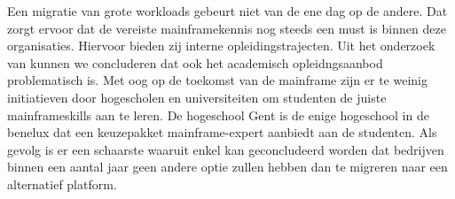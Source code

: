 Een migratie van grote workloads gebeurt niet van de ene dag op de andere. Dat zorgt ervoor dat de vereiste mainframekennis nog steeds een must is binnen deze organisaties. Hiervoor bieden zij interne opleidingstrajecten. Uit het onderzoek van \textcite{2020} kunnen we concluderen dat ook het academisch opleidngsaanbod problematisch is. Met oog op de toekomst van de mainframe zijn er te weinig initiatieven door hogescholen en universiteiten om studenten de juiste mainframeskills aan te leren. De hogeschool Gent is de enige hogeschool in de benelux dat een keuzepakket mainframe-expert aanbiedt aan de studenten. Als gevolg is er een schaarste waaruit enkel kan geconcludeerd worden dat bedrijven binnen een aantal jaar geen andere optie zullen hebben dan te migreren naar een alternatief platform. 

